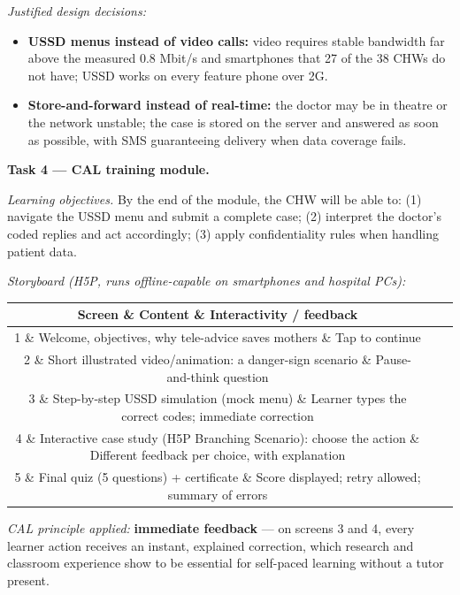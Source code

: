 \documentclass[11pt]{article}
\begin{document}
\emph{Justified design decisions:}
\begin{itemize}
\item \textbf{USSD menus instead of video calls:} video requires stable bandwidth far above the measured 0.8 Mbit/s and smartphones that 27 of the 38 CHWs do not have; USSD works on every feature phone over 2G.
\item \textbf{Store-and-forward instead of real-time:} the doctor may be in theatre or the network unstable; the case is stored on the server and answered as soon as possible, with SMS guaranteeing delivery when data coverage fails.
\end{itemize}

\textbf{Task 4 — CAL training module.}\par
\emph{Learning objectives.} By the end of the module, the CHW will be able to: (1) navigate the USSD menu and submit a complete case; (2) interpret the doctor's coded replies and act accordingly; (3) apply confidentiality rules when handling patient data.

\emph{Storyboard (H5P, runs offline-capable on smartphones and hospital PCs):}

\begin{center}
\begin{tabularx}{\linewidth}{|c|X|X|}
\hline
\rowcolor{popblueL} \textbf{Screen} \& \textbf{Content} \& \textbf{Interactivity / feedback} \\
\hline
1 \& Welcome, objectives, why tele-advice saves mothers \& Tap to continue \\
\hline
2 \& Short illustrated video/animation: a danger-sign scenario \& Pause-and-think question \\
\hline
3 \& Step-by-step USSD simulation (mock menu) \& Learner types the correct codes; immediate correction \\
\hline
4 \& Interactive case study (H5P Branching Scenario): choose the action \& Different feedback per choice, with explanation \\
\hline
5 \& Final quiz (5 questions) + certificate \& Score displayed; retry allowed; summary of errors \\
\hline
\end{tabularx}
\end{center}

\emph{CAL principle applied:} \textbf{immediate feedback} — on screens 3 and 4, every learner action receives an instant, explained correction, which research and classroom experience show to be essential for self-paced learning without a tutor present.
\end{document}

